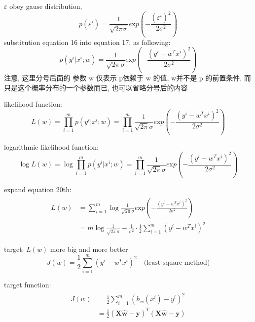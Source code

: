 \documentclass[12pt]{ctexart}%
\begin{document}
	$\varepsilon$ obey gause distribution, \begin{equation}p(\varepsilon^i) = \frac{1}{\surd{2\pi \sigma}}e\text{x}p(-\frac{(\varepsilon^i)^2}{2\sigma^2})\end{equation}
	substitution equation 16 into equation 17, as following:
	\begin{equation}
	p(y^i|x^i; w) = \frac{1}{\surd{2\pi} \sigma}e\text{x}p(-\frac{(y^i - w^T x^i)^2}{2\sigma^2})
	\end{equation}
	注意, 这里分号后面的 参数 w 仅表示 p依赖于 w 的值, w并不是 p 的前置条件, 而只是这个概率分布的一个参数而已, 也可以省略分号后的内容
	
	likelihood function: %
	\begin{equation}
	L(w) = \underset{i=1}{\overset{m}{\mathop{\prod }}} p(y^i|x^i; w) = \underset{i=1}{\overset{m}{\mathop{\prod }}} \frac{1}{\surd{2\pi} \sigma}e\text{x}p(-\frac{(y^i - w^T x^i)^2}{2\sigma^2})
	\end{equation}
	 
	logarithmic likelihood function: %
	\begin{equation}
		\log{L(w)} = \log{\underset{i=1}{\overset{m}{\mathop{\prod }}} p(y^i|x^i; w) = \underset{i=1}{\overset{m}{\mathop{\prod }}} \frac{1}{\surd{2\pi} \sigma}e\text{x}p(-\frac{(y^i - w^T x^i)^2}{2\sigma^2})}
	\end{equation}
	
	expand equation 20th: 
	\begin{align}
	\begin{split}
	L(w) &= \sum_{i=1}^{m} \log \frac{1}{\surd{2\pi} \sigma}e\text{x}p(-\frac{(y^i - w^T x^i)^2}{2\sigma^2}) \\
		 &= m\log \frac{1}{\surd{2\pi} \sigma} - \frac{1}{\sigma^2}\cdot \frac{1}{2}\sum_{i=1}^{m}(y^i - w^T x^i)^2
	\end{split}
	\end{align}
	
	target: $L(w)$ more big and more better
	\begin{equation}
	J(w) = \frac{1}{2}\sum_{i=1}^{m}(y^i - w^T x^i)^2\quad\text{(least square method)}
	\end{equation}
	
	target function:
	\begin{align}
		\begin{split}
	J(w) &= \frac{1}{2}\sum_{i=1}^{m}(h_w(x^i) - y^i)^2\\
		 &= \frac{1}{2}(\boldsymbol{X\hat{w}} - \boldsymbol{y})^T(\boldsymbol{X\hat{w}} - \boldsymbol{y})
		 \end{split}
	\end{align}
	
\end{document}
